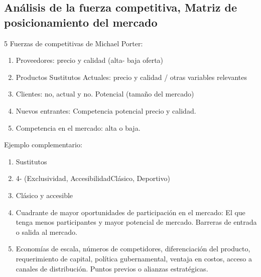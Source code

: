 

\subsection{Análisis de la fuerza competitiva, Matriz de posicionamiento del mercado}
5 Fuerzas de competitivas de Michael Porter:
\begin{enumerate}
    \item Proveedores: precio y calidad (alta- baja oferta)
    \item Productos Sustitutos Actuales: precio y calidad / otras variables relevantes 
    \item Clientes: no, actual y no. Potencial (tamaño del mercado)
    \item Nuevos entrantes: Competencia potencial precio y calidad.
    \item Competencia en el mercado: alta o baja.
\end{enumerate}
Ejemplo complementario: 
\begin{enumerate}
    \item {} Sustitutos 
    \item {} 4- (Exclusividad, AccesibilidadClásico, Deportivo)
    \item {} Clásico y accesible 
    \item Cuadrante de mayor oportunidades de participación en el mercado: El que tenga menos participantes y mayor potencial de mercado. Barreras de entrada o salida al mercado. 
    \item Economías de escala, números de competidores, diferenciación del producto, requerimiento de capital, política gubernamental, ventaja en costos, acceso a canales de distribución. Puntos previos o alianzas estratégicas.
\end{enumerate}

